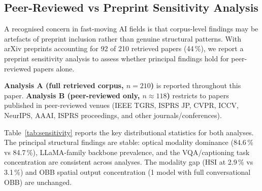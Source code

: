 \subsection{Peer-Reviewed vs Preprint Sensitivity Analysis}\label{sec8:sensitivity}

A recognised concern in fast-moving AI fields is that corpus-level findings may be
artefacts of preprint inclusion rather than genuine structural patterns. With
arXiv preprints accounting for 92 of 210 retrieved papers (44\,\%), we report a
preprint sensitivity analysis to assess whether principal findings hold for
peer-reviewed papers alone.

\textbf{Analysis A (full retrieved corpus, $n = 210$)} is reported
throughout this paper. \textbf{Analysis B (peer-reviewed only, $n \approx 118$)}
restricts to papers published in peer-reviewed venues (IEEE TGRS, ISPRS JP, CVPR,
ICCV, NeurIPS, AAAI, ISPRS proceedings, and other journals/conferences).

Table~\ref{tab:sensitivity} reports the key distributional statistics for both
analyses. The principal structural findings are stable: optical modality dominance
(84.6\,\% vs 84.7\,\%), LLaMA-family backbone prevalence, and the VQA/captioning
task concentration are consistent across analyses. The modality gap (HSI at 2.9\,\%
vs 3.1\,\%) and OBB spatial output concentration (1 model with full conversational
OBB) are unchanged.

